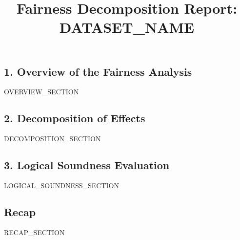 \documentclass[11pt, a4paper]{article}
\title{\textbf{Fairness Decomposition Report: {{ DATASET_NAME }}}}
\begin{document}
\maketitle

\subsection*{1. Overview of the Fairness Analysis}
{{ OVERVIEW_SECTION }}

\subsection*{2. Decomposition of Effects}
{{ DECOMPOSITION_SECTION }}

\subsection*{3. Logical Soundness Evaluation}
{{ LOGICAL_SOUNDNESS_SECTION }}

\subsection*{Recap}
{{ RECAP_SECTION }}
\end{document}
